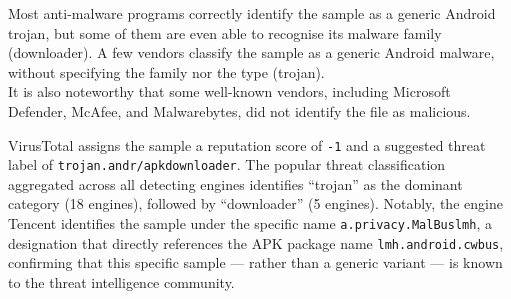         Most anti-malware programs correctly identify the sample as a generic Android trojan, but some of them are even able to recognise its malware family (downloader).
        A few vendors classify the sample as a generic Android malware, without specifying the family nor the type (trojan).\\
        It is also noteworthy that some well-known vendors, including Microsoft Defender, McAfee, and Malwarebytes, did not identify the file as malicious.

        VirusTotal assigns the sample a reputation score of \texttt{-1} and a suggested threat label of \texttt{trojan.andr/apkdownloader}. The popular threat classification aggregated across all detecting engines identifies ``trojan'' as the dominant category (18 engines), followed by ``downloader'' (5 engines). Notably, the engine Tencent identifies the sample under the specific name \texttt{a.privacy.MalBuslmh}, a designation that directly references the APK package name \texttt{lmh.android.cwbus}, confirming that this specific sample --- rather than a generic variant --- is known to the threat intelligence community.

         \clearpage
